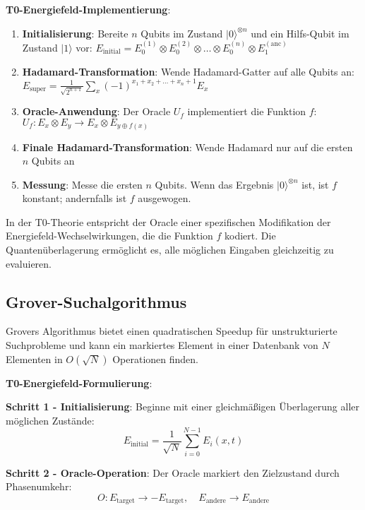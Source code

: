 \documentclass[12pt,a4paper]{article}
\theoremstyle{definition}
\theoremstyle{remark}
\begin{document}
\textbf{T0-Energiefeld-Implementierung}:
\begin{enumerate}
	\item \textbf{Initialisierung}: Bereite $n$ Qubits im Zustand $|0\rangle^{\otimes n}$ und ein Hilfs-Qubit im Zustand $|1\rangle$ vor:
	$E_{\text{initial}} = E_0^{(1)} \otimes E_0^{(2)} \otimes \ldots \otimes E_0^{(n)} \otimes E_1^{(\text{anc})}$
	
	\item \textbf{Hadamard-Transformation}: Wende Hadamard-Gatter auf alle Qubits an:
	$E_{\text{super}} = \frac{1}{\sqrt{2^{n+1}}} \sum_{x} (-1)^{x_1 + x_2 + \ldots + x_n + 1} E_x$
	
	\item \textbf{Oracle-Anwendung}: Der Oracle $U_f$ implementiert die Funktion $f$:
	$U_f: E_x \otimes E_y \rightarrow E_x \otimes E_{y \oplus f(x)}$
	
	\item \textbf{Finale Hadamard-Transformation}: Wende Hadamard nur auf die ersten $n$ Qubits an
	
	\item \textbf{Messung}: Messe die ersten $n$ Qubits. Wenn das Ergebnis $|0\rangle^{\otimes n}$ ist, ist $f$ konstant; andernfalls ist $f$ ausgewogen.
\end{enumerate}

In der T0-Theorie entspricht der Oracle einer spezifischen Modifikation der Energiefeld-Wechselwirkungen, die die Funktion $f$ kodiert. Die Quanten{\"u}berlagerung erm{\"o}glicht es, alle m{\"o}glichen Eingaben gleichzeitig zu evaluieren.

\subsection{Grover-Suchalgorithmus}

Grovers Algorithmus bietet einen quadratischen Speedup f{\"u}r unstrukturierte Suchprobleme und kann ein markiertes Element in einer Datenbank von $N$ Elementen in $O(\sqrt{N})$ Operationen finden.

\textbf{T0-Energiefeld-Formulierung}:

\textbf{Schritt 1 - Initialisierung}:
Beginne mit einer gleichm{\"a}{\ss}igen {\"U}berlagerung aller m{\"o}glichen Zust{\"a}nde:
\begin{equation}
	E_{\text{initial}} = \frac{1}{\sqrt{N}} \sum_{i=0}^{N-1} E_i(x,t)
\end{equation}

\textbf{Schritt 2 - Oracle-Operation}:
Der Oracle markiert den Zielzustand durch Phasenumkehr:
\begin{equation}
	O: E_{\text{target}} \rightarrow -E_{\text{target}}, \quad E_{\text{andere}} \rightarrow E_{\text{andere}}
\end{equation}
\end{document}
